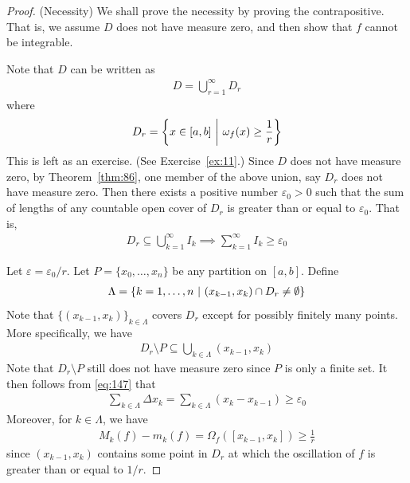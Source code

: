 \documentclass[thmcnt=section, 12pt]{my-elegantbook}
\begin{document}
\begin{proof}
    (Necessity) We shall prove the necessity by proving the contrapositive.
    That is, we assume $D$ does not have measure zero,
    and then show that $f$ cannot be integrable.

    Note that $D$ can be written as
    \begin{align*}
        D = \bigcup_{r=1}^\infty D_r
    \end{align*}
    where
    \begin{align*}
        D_r = \left\{ x \in [a, b] \ \middle| \ \omega_f(x) \geq \frac{1}{r} \right\}
    \end{align*}
    This is left as an exercise. (See Exercise~\ref{ex:11}.)
    Since $D$ does not have measure zero,
    by Theorem~\ref{thm:86},
    one member of the above union, say $D_r$
    does not have measure zero.
    Then there exists a positive number $\varepsilon_0 > 0$
    such that the sum of lengths of any countable open cover of $D_r$
    is greater than or equal to $\varepsilon_0$.
    That is,
    \begin{align}
        D_r \subseteq \bigcup_{k=1}^\infty I_k
        \implies \sum_{k=1}^\infty I_k \geq \varepsilon_0
        \label{eq:147}
    \end{align}

    Let $\varepsilon = \varepsilon_0 / r$.
    Let $P = \{x_0, \ldots, x_n\}$ be any partition on $[a, b]$.
    Define
    \begin{align*}
        \Lambda
        = \left\{ k=1, \ldots, n \ \middle| \ (x_{k-1}, x_k) \cap D_r \neq \emptyset \right\}
    \end{align*}
    Note that $\{(x_{k-1}, x_k)\}_{k \in \Lambda}$ covers $D_r$
    except for possibly finitely many points.
    More specifically, we have
    \begin{align*}
        D_r \setminus P \subseteq \bigcup_{k \in \Lambda} (x_{k-1}, x_k)
    \end{align*}
    Note that $D_r \setminus P$ still does not have measure zero
    since $P$ is only a finite set.
    It then follows from \eqref{eq:147} that
    \begin{align*}
        \sum_{k \in \Lambda} \Delta x_k
        = \sum_{k \in \Lambda} (x_k - x_{k-1})
        \geq \varepsilon_0
    \end{align*}
    Moreover, for $k \in \Lambda$, we have
    \begin{align*}
        M_k(f) - m_k(f)
        = \Omega_f([x_{k-1}, x_k])
        \geq \frac{1}{r}
    \end{align*}
    since $(x_{k-1}, x_k)$ contains some point in $D_r$ at which
    the oscillation of $f$ is greater than or equal to $1 / r$.


\end{proof}
\end{document}
